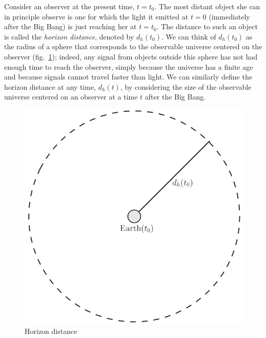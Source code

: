 Consider an observer at the present time, $t=t_0$. The most distant object she can in principle observe is one for which the light it emitted at $t=0$ (immediately after the Big Bang) is just reaching her at $t=t_0$. The distance to such an object is called the {\it horizon distance}, denoted by $d_h(t_0)$. We can think of $d_h(t_0)$ as the radius of a sphere that corresponds to the observable universe centered on the observer (fig.\ \ref{fig:lec12_2}); indeed, any signal from objects outside this sphere has not had enough time to reach the observer, simply because the universe has a finite age and because signals cannot travel faster than light. We can similarly define the horizon distance at any time, $d_h(t)$, by considering the size of the observable universe centered on an observer at a time $t$ after the Big Bang.
\begin{figure}[ht]
\begin{center}
\includegraphics[scale=0.4]{Draw/lec12_2.png}
\end{center}
\caption{Horizon distance}
\label{fig:lec12_2}
\end{figure}

